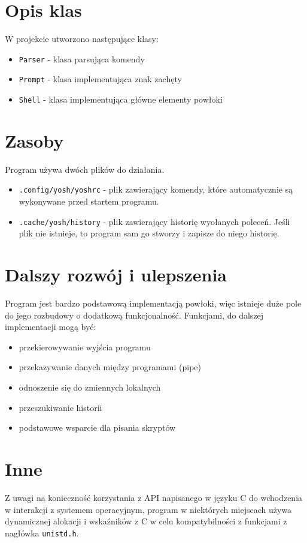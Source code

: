 \documentclass{article}
\begin{document}
\section{Opis klas}

W projekcie utworzono następujące klasy:
\begin{itemize}
    \item \texttt{Parser} - klasa parsująca komendy
    \item \texttt{Prompt} - klasa implementująca znak zachęty
    \item \texttt{Shell}  - klasa implementująca główne elementy powłoki
\end{itemize}
     
\section{Zasoby}
Program używa dwóch plików do działania.
\begin{itemize}
    \item \texttt{.config/yosh/yoshrc} - plik zawierający komendy, które automatycznie są wykonywane przed startem 
    programu. 
    \item \texttt{.cache/yosh/history} - plik zawierający historię wyołanych poleceń. Jeśli plik nie istnieje, to
    program sam go stworzy i zapisze do niego historię.
\end{itemize}


\section{Dalszy rozwój i ulepszenia}
Program jest bardzo podstawową implementacją powłoki, więc istnieje duże pole do jego rozbudowy o dodatkową
funkcjonalność. Funkcjami, do dalszej implementacji mogą być:
\begin{itemize}
    \item przekierowywanie wyjścia programu
    \item przekazywanie danych między programami (pipe)
    \item odnoszenie się do zmiennych lokalnych
    \item przeszukiwanie historii
    \item podstawowe wsparcie dla pisania skryptów
\end{itemize}

\section{Inne}

Z uwagi na konieczność korzystania z API napisanego w języku C do wchodzenia w interakcji z systemem operacyjnym,
program w niektórych miejscach używa dynamicznej alokacji i wskaźników z C w celu kompatybilności z funkcjami
z nagłówka \texttt{unistd.h}.
\end{document}
